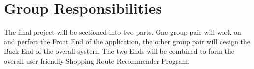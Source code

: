 \documentclass[10pt, a4paper, onecolumn]{scrartcl}
\begin{document}
	\section{Group Responsibilities}
	
		The final project will be sectioned into two parts. One group pair will work on and perfect the Front End of the application, the other group pair will design the Back End of the overall system. The two Ends will be combined to form the overall user friendly Shopping Route Recommender Program. 
	

	
		
		
\end{document}
